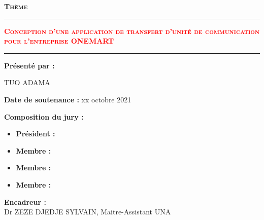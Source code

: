 \begin{titlepage}
\begin{center}
		\normalsize
		\vspace{0.005cm}
		\Huge\textbf{\textsc{Th\`eme}}\\
		\noindent\rule{\textwidth}{0.9mm}
		\Large{{\textbf{\textcolor{red}{\textsc{Conception d\textquoteright une application de transfert d'unité de communication pour l'entreprise ONEMART}}}}}
		\noindent\rule{\textwidth}{0.9mm}
	\end{center}
	\begin{center}
		\textbf{Présenté par : } \\
		\begin{center}
			\textsc{TUO ADAMA}
		\end{center}
		\vspace*{0.5mm}
		\textbf{Date de soutenance : } xx octobre 2021  
	\end{center}
	\vspace*{2mm}
	\begin{minipage}{0.5\textwidth}
		\begin{flushleft} \large
			\textbf{Composition du jury : } 
			\begin{itemize}[leftmargin=* ,parsep=0cm,itemsep=0.2cm,topsep=0.2cm]
				\item{\textbf{Pr\'esident : }}
				\item {\textbf{Membre : }}
				\item {\textbf{Membre : }}
				\item {\textbf{Membre : }}
			\end{itemize}  
		\end{flushleft}
	\end{minipage}
	\begin{minipage}{0.5\textwidth}
		\begin{flushright} \large
			\textbf{Encadreur : } \\ Dr ZEZE DJEDJE SYLVAIN, Maitre-Assistant UNA
		\end{flushright}
	\end{minipage}
	
\end{titlepage}